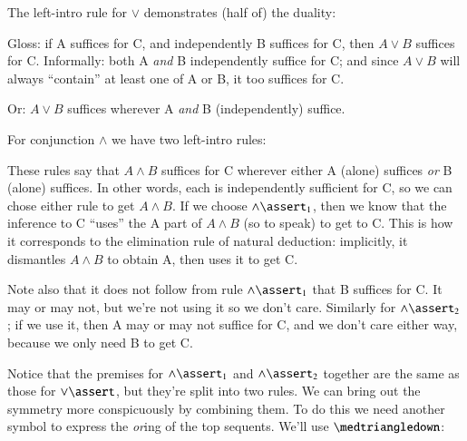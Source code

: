 The left-intro rule for \(\lor\) demonstrates (half of) the duality:


Gloss: if A suffices for C, and independently B suffices for C,
then \(A\lor B\) suffices for C. Informally: both A \textit{and} B
independently suffice for C; and since \(A\lor B\) will always
``contain'' at least one of A or B, it too suffices for C.

Or: \(A\lor B\) suffices wherever A \textit{and} B (independently)
suffice.

For conjunction \(\land\) we have two left-intro rules:


These rules say that \(A\land B\) suffices for C wherever either A
(alone) suffices \textit{or} B (alone) suffices. In other words, each
is independently sufficient for C, so we can chose either rule to get
\(A\land B\). If we choose \(\land\linfer_1\), then we know that the
inference to C ``uses'' the A part of \(A\land B\) (so to speak) to
get to C. This is how it corresponds to the elimination rule of
natural deduction: implicitly, it dismantles \(A\land B\) to obtain A,
then uses it to get C.

Note also that it does not follow from rule \(\land\linfer_1\) that B
suffices for C. It may or may not, but we're not using it so we don't
care. Similarly for \(\land\linfer_2\); if we use it, then A may or may
not suffice for C, and we don't care either way, because we only need
B to get C.

Notice that the premises for \(\land\linfer_1\) and \(\land\linfer_2\)
together are the same as those for \(\lor\linfer\), but they're split
into two rules. We can bring out the symmetry more conspicuously by
combining them. To do this we need another symbol to express the
\textit{or}ing of the top sequents. We'll use \(\medtriangledown\):

